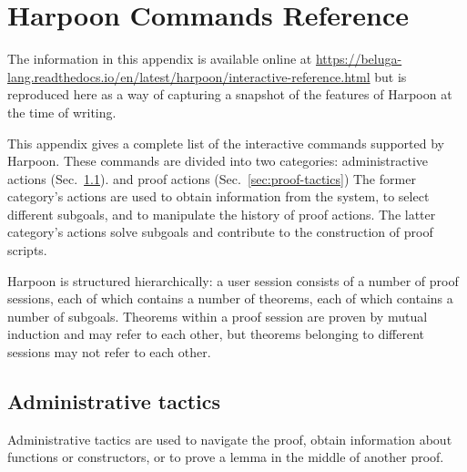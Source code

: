 \chapter{Harpoon Commands Reference}

The information in this appendix is available online at
\url{https://beluga-lang.readthedocs.io/en/latest/harpoon/interactive-reference.html}
but is reproduced here as a way of capturing a snapshot of the features of
Harpoon at the time of writing.

This appendix gives a complete list of the interactive commands supported by
Harpoon. These commands are divided into two categories:
administractive actions
(Sec.~\ref{sec:admin-tactics}).
and
proof actions
(Sec.~\ref{sec:proof-tactics})
The former category's actions are used to obtain information from the system, to
select different subgoals, and to manipulate the history of proof actions.
The latter category's actions solve subgoals and contribute to the construction
of proof scripts.

Harpoon is structured hierarchically: a user session consists of a number of
proof sessions, each of which contains a number of theorems, each of which
contains a number of subgoals. Theorems within a proof session are proven by
mutual induction and may refer to each other, but theorems belonging to
different sessions may not refer to each other.

\section{Administrative tactics}%
\label{sec:admin-tactics}

Administrative tactics are used to navigate the proof, obtain information about
functions or constructors, or to prove a lemma in the middle of another proof.

